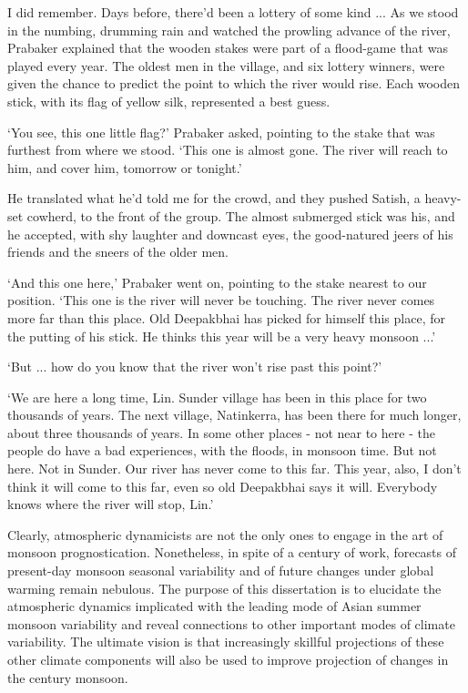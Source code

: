 {	I did remember. Days before, there'd been a lottery of some kind ... As we stood in the numbing, drumming rain and watched the prowling advance of the river, Prabaker explained that the wooden stakes were part of a flood-game that was played every year. The oldest men in the village, and six lottery winners, were given the chance to predict the point to which the river would rise. Each wooden stick, with its flag of yellow silk, represented a best guess.
	
	`You see, this one little flag?' Prabaker asked, pointing to the stake that was furthest from where we stood. `This one is almost gone. The river will reach to him, and cover him, tomorrow or tonight.' 
	
	He translated what he'd told me for the crowd, and they pushed Satish, a heavy-set cowherd, to the front of the group. The almost submerged stick was his, and he accepted, with shy laughter and downcast eyes, the good-natured jeers of his friends and the sneers of the older men.
	
	`And this one here,' Prabaker went on, pointing to the stake nearest to our position. `This one is the river will never be touching. The river never comes more far than this place. Old Deepakbhai has picked for himself this place, for the putting of his stick. He thinks this year will be a very heavy monsoon ...'
	
	
	`But ... how do you know that the river won't rise past this point?'
	
	`We are here a long time, Lin. Sunder village has been in this place for two thousands of years. The next village, Natinkerra, has been there for much longer, about three thousands of years. In some other places - not near to here - the people do have a bad experiences, with the floods, in monsoon time. But not here. Not in Sunder. Our river has never come to this far. This year, also, I don't think it will come to this far, even so old Deepakbhai says it will. Everybody knows where the river will stop, Lin.'
	
	}
	
	Clearly, atmospheric dynamicists are not the only ones to engage in the art of monsoon prognostication. Nonetheless, in spite of a century of work, forecasts of present-day monsoon seasonal variability and of future changes under global warming remain nebulous. The purpose of this dissertation is to elucidate the atmospheric dynamics implicated with the leading mode of Asian summer monsoon variability and reveal connections to other important modes of climate variability. The ultimate vision is that increasingly skillful projections of these other climate components will also be used to improve projection of changes in the  century monsoon.

